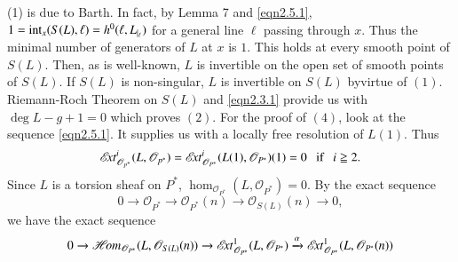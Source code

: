 \begin{Proof}
(1) is due to Barth. In fact, by \cite{key1} Lemma 7 and
  \eqref{eqn2.5.1}, $1=\text{\rm int}_x(S(L),\ell)=h^{0}(\ell, L_{\mid_{\ell}})$
  for a general line $\ell$ passing through $x$. Thus the minimal
  number of generators of $L$ at $x$ is $1$. This holds at every
  smooth point of $S(L)$. Then, as is well-known, $L$ is invertible on
  the open set of smooth points of $S(L)$. If $S(L)$ is non-singular,
  $L$ is invertible on $S(L)$ by\pageoriginale virtue of
  $(1)$. Riemann-Roch Theorem on $S(L)$ and \eqref{eqn2.3.1} provide
  us with $\deg L-g+1=0$ which proves $(2)$. For the proof of $(4)$,
  look at the sequence \eqref{eqn2.5.1}. It supplies us with a locally
  free resolution of $L(1)$. Thus
  $$
  \mathscr{E}\!{\it xt}^{i}_{\mathscr{O}_{p^{*}}}(L,\mathscr{O}_{p^{*}})=\mathscr{E}\!{\it xt}^{i}_{\mathscr{O}_{P^{\ast}}}(L(1),\mathscr{O}_{P^{\ast}})(1)=0\text{~~ if~~ } i\geqq 2.
  $$ 
Since $L$ is a torsion sheaf on $P^{\ast}$,
  $\hom_{\mathscr{O}_{P^{\ast}}}(L,\mathscr{O}_{P^{\ast}})=0$. By the
  exact sequence 
$$
0\to \mathscr{O}_{P^{\ast}}\to \mathscr{O}_{P^{\ast}}(n)\to
\mathscr{O}_{S(L)}(n)\to 0,
$$
we have the exact sequence
$$
0\to \mathscr{H}\!{\it om}_{\mathscr{O}_{P^{\ast}}}(L,\mathscr{O}_{S(L)}(n))\to
\mathscr{E}\!{\it xt}^{1}_{\mathscr{O}_{P^{\ast}}}(L,\mathscr{O}_{P^{\ast}})\xrightarrow{\alpha}\mathscr{E}\!{\it xt}^{1}_{\mathscr{O}_{P^\ast}}(L,\mathscr{O}_{P^{\ast}}(n))  
$$


\end{Proof}
